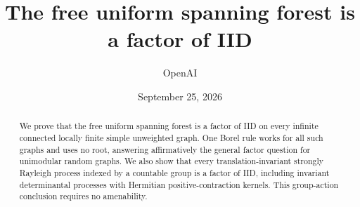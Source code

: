 \documentclass[11pt]{article}
\title{The free uniform spanning forest is a factor of IID}
\author{OpenAI}
\date{September 25, 2026}
\numberwithin{equation}{section}
\theoremstyle{definition}
\theoremstyle{remark}
\newcommand{\1}{\mathbf 1}
\begin{document}
\maketitle
\begin{abstract}
We prove that the free uniform spanning forest is a factor of IID on every
infinite connected locally finite simple unweighted graph. One Borel rule works
for all such graphs and uses no root, answering affirmatively the general factor
question for unimodular random graphs. We also show that every
translation-invariant strongly Rayleigh process indexed by a
countable group is a factor of IID, including invariant determinantal
processes with Hermitian positive-contraction kernels. This group-action
conclusion requires no amenability.
\end{abstract}








\end{document}
